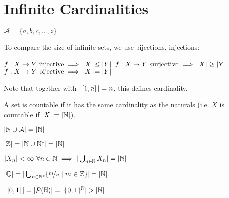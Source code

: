 \chapter{Infinite Cardinalities}
\begin{definition}[Alphabet]
	$\mathcal{A} = \{ a,b,c, \dots, z \}$
\end{definition}
To compare the size of infinite sets, we use bijections, injections:
\begin{definition}
	$f: X \to Y \text{ injective} \implies | X | \leq | Y |$
	$f: X \to Y \text{ surjective} \implies | X | \geq | Y |$
	$f: X \to Y \text{ bijective} \implies | X | = | Y |$
\end{definition}
Note that together with $| \left[ 1,n \right] |=n$, this defines cardinality.
\begin{definition}
	A set is countable if it has the same cardinality as the naturals (i.e. $X$ is countable if $| X | = | \mathbb{N} |$).
\end{definition}

\begin{property}
	$| \mathbb{N} \cup \mathcal{A} | = | \mathbb{N} |$
\end{property}
\begin{property}
	$| \mathbb{Z} | = | \mathbb{N} \cup \mathbb{N}^* | = | \mathbb{N} |$
\end{property}
\begin{property}
	$| X_n |<\infty \ \forall n \in \mathbb{N} \implies | \bigcup_{n \in \mathbb{N}} X_n | = | \mathbb{N} |$
\end{property}
\begin{property}
	$| \mathbb{Q} | = | \bigcup_{n \in \mathbb{N}^*} \{ \nicefrac{m}{n} \mid m \in \mathbb{Z} \} | = | \mathbb{N} |$
\end{property}
\begin{property}
	$|  \left[ 0,1 \right[  | = | \mathcal{P}(\mathbb{N}) | = | \{0,1\}^{\mathbb{N}} | > | \mathbb{N} |$
\end{property}





